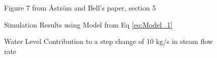         \begin{figure}[ht]
            \begin{center}
                
                Figure 7 from \r{A}str\"{o}m and Bell's paper, section 5 \cite{Astrom}


                Simulation Results using Model from Eq \eqref{eq:Model_1}
                
                \caption{Water Level Contribution to a step change of 10 kg/s in steam flow rate}
                \label{fig:Fig7B}
            \end{center}
        \end{figure}  %
